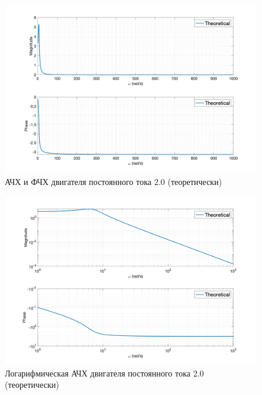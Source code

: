 \begin{figure}[ht!]
    \centering
    \includegraphics[width=\textwidth]{media/plots/task2_freq_resp_eq_lin.png}
    \caption{АЧХ и ФЧХ двигателя постоянного тока 2.0 (теоретически)}
    \label{fig:task2_freq_resp_eq_lin}
\end{figure}
\begin{figure}[ht!]
    \centering
    \includegraphics[width=\textwidth]{media/plots/task2_freq_resp_eq_loglog.png}
    \caption{Логарифмическая АЧХ двигателя постоянного тока 2.0 (теоретически)}
    \label{fig:task2_freq_resp_eq_loglog}
\end{figure}

